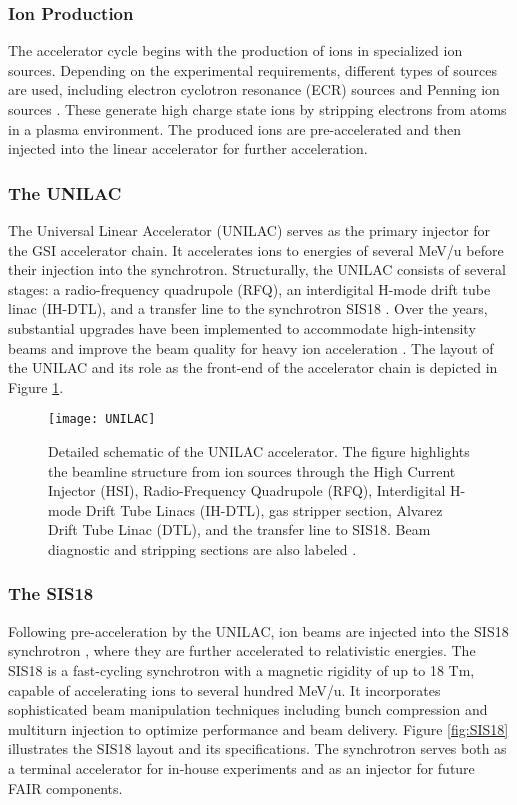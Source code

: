 \subsubsection{Ion Production}

The accelerator cycle begins with the production of ions in specialized ion sources. Depending on the experimental requirements, different types of sources are used, including electron cyclotron resonance (ECR) sources and Penning ion sources \cite{hollinger_status_2008}. These generate high charge state ions by stripping electrons from atoms in a plasma environment. The produced ions are pre-accelerated and then injected into the linear accelerator for further acceleration.


\subsubsection{The UNILAC}

The Universal Linear Accelerator (UNILAC) \cite{vormann_high_2023} serves as the primary injector for the GSI accelerator chain. It accelerates ions to energies of several MeV/u before their injection into the synchrotron. Structurally, the UNILAC consists of several stages: a radio-frequency quadrupole (RFQ), an interdigital H-mode drift tube linac (IH-DTL), and a transfer line to the synchrotron SIS18 \cite{barth_high_2022}. Over the years, substantial upgrades have been implemented to accommodate high-intensity beams and improve the beam quality for heavy ion acceleration . The layout of the UNILAC and its role as the front-end of the accelerator chain is depicted in Figure \ref{fig:UNILAC}.


\begin{figure}
	\texttt{[image: UNILAC]}
	\caption{Detailed schematic of the UNILAC accelerator. The figure highlights the beamline structure from ion sources through the High Current Injector (HSI), Radio-Frequency Quadrupole (RFQ), Interdigital H-mode Drift Tube Linacs (IH-DTL), gas stripper section, Alvarez Drift Tube Linac (DTL), and the transfer line to SIS18. Beam diagnostic and stripping sections are also labeled \cite{barth_high_2022}.}
	\label{fig:UNILAC}
\end{figure}


\subsubsection{The SIS18}

Following pre-acceleration by the UNILAC, ion beams are injected into the SIS18 synchrotron \cite{singh2014tune}, where they are further accelerated to relativistic energies. The SIS18 is a fast-cycling synchrotron with a magnetic rigidity of up to 18 Tm, capable of accelerating ions to several hundred MeV/u. It incorporates sophisticated beam manipulation techniques including bunch compression and multiturn injection to optimize performance and beam delivery. Figure \ref{fig:SIS18} illustrates the SIS18 layout and its specifications. The synchrotron serves both as a terminal accelerator for in-house experiments and as an injector for future FAIR components.

